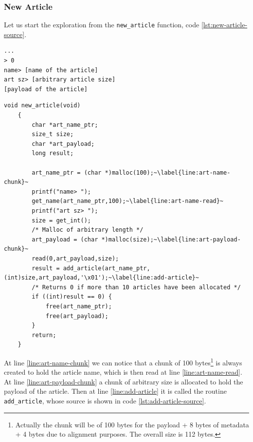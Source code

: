 \documentclass{article}
\numberwithin{equation}{subsection}
\begin{document}
\subsubsection{New Article}
Let us start the exploration from the \texttt{new\_article} function, code \ref{lst:new-article-source}.\newline
\noindent
\begin{minipage}{\textwidth}
\centering
\lstset{style=consolestyle}
\begin{lstlisting}[caption={New article menu of asciigal executable.},captionpos=b,label={lst:new-article-menu}]
...
> 0
name> [name of the article]
art sz> [arbitrary article size]
[payload of the article]
\end{lstlisting}
\end{minipage}
\noindent
\begin{minipage}{\textwidth}
\centering
\lstset{style=cstyle}
\begin{lstlisting}[caption={New\_article routine of asciigal source code.},captionpos=b,label={lst:new-article-source}]
    void new_article(void)
	{
		char *art_name_ptr;
		size_t size;
		char *art_payload;
		long result;
		
		art_name_ptr = (char *)malloc(100);~\label{line:art-name-chunk}~
		printf("name> ");
		get_name(art_name_ptr,100);~\label{line:art-name-read}~
		printf("art sz> ");
		size = get_int();
		/* Malloc of arbitrary length */
		art_payload = (char *)malloc(size);~\label{line:art-payload-chunk}~
		read(0,art_payload,size);
		result = add_article(art_name_ptr,(int)size,art_payload,'\x01');~\label{line:add-article}~
		/* Returns 0 if more than 10 articles have been allocated */
		if ((int)result == 0) {
			free(art_name_ptr);
			free(art_payload);
		}
		return;
	}
\end{lstlisting}
\end{minipage}
At line \ref{line:art-name-chunk} we can notice that a chunk of 100 bytes\footnote{Actually the chunk will be of 100 bytes for the payload + 8 bytes of metadata + 4 bytes due to alignment purposes. The overall size is 112 bytes.} is always created to hold the article name, which is then read at line \ref{line:art-name-read}. At line \ref{line:art-payload-chunk} a chunk of arbitrary size is allocated to hold the payload of the article. Then at line \ref{line:add-article} it is called the routine \texttt{add\_article}, whose source is shown in code \ref{lst:add-article-source}.
\noindent
\end{document}
